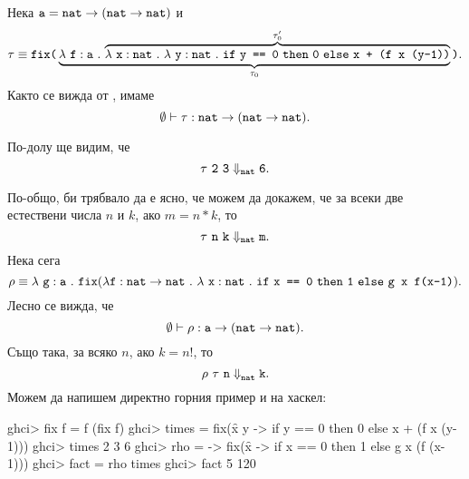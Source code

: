 \begin{example}
  Нека $\texttt{a} = \texttt{nat} \to (\texttt{nat} \to \texttt{nat})$ и 
  \[\tau \equiv \texttt{fix}\texttt{(}\underbrace{\lambda~\texttt{f}:\texttt{a}~.~{\overbrace{\lambda~\texttt{x}:\texttt{nat}~.~{\lambda~\texttt{y}:\texttt{nat}~.~{\texttt{if}\ \texttt{y == 0}\ \texttt{then}\ \texttt{0}\ \texttt{else}\ \texttt{x + (f x (y-1))}}}}^{\tau'_0}}}_{\tau_0}\texttt{)}.\]
  Както се вижда от , имаме 
  \[\emptyset \vdash \tau:\texttt{nat} \to (\texttt{nat} \to \texttt{nat}).\]

  По-долу ще видим, че
  \[\tau\ \vv{2}\ \vv{3} \Downarrow_{\vv{nat}} \vv{6}.\]
  
  По-общо, би трябвало да е ясно, че можем да докажем, че за всеки две естествени числа $n$ и $k$, ако $m = n * k$, то
  \[\tau\ \texttt{n}\ \texttt{k} \Downarrow_{\texttt{nat}} \texttt{m}.\]
  Нека сега
  \[\rho \equiv \lambda~\texttt{g}:\texttt{a}~.~{\texttt{fix}(\lambda \texttt{f} : \texttt{nat}\to\texttt{nat}\ .\ \lambda~\texttt{x}:\texttt{nat}~.~{\texttt{if}\ \texttt{x == 0}\ \texttt{then}\ \texttt{1}\ \texttt{else}\ \texttt{g x f(x-1)}}}).\]
  Лесно се вижда, че
  \[\emptyset \vdash \rho : \texttt{a} \to (\texttt{nat} \to \texttt{nat}).\]
  Също така, за всяко $n$, ако $k = n!$, то
  \[ \rho\ \tau\ \texttt{n} \Downarrow^{}_{\texttt{nat}} \texttt{k}.\]
  Можем да напишем директно горния пример и на хаскел:
\begin{haskellcode}
ghci> fix f = f (fix f)
ghci> times = fix(\f x y -> if y == 0 then 0 else x + (f x (y-1)))
ghci> times 2 3
6
ghci> rho = \g -> fix(\f x -> if x == 0 then 1 else g x (f (x-1)))
ghci> fact = rho times
ghci> fact 5
120
\end{haskellcode}
\end{example}

\def\extraVskip{4pt}

